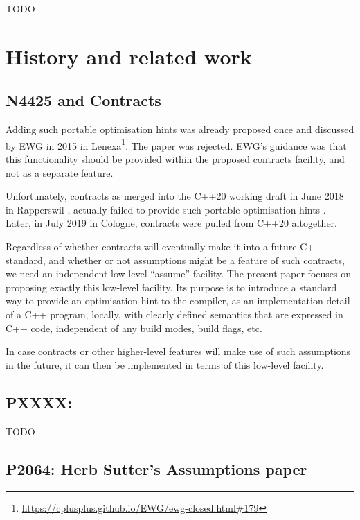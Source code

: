 TODO


\section{History and related work}

\subsection{N4425 and Contracts}

Adding such portable optimisation hints was already proposed once \cite{N4425} and discussed by EWG in 2015 in Lenexa\footnote{\url{https://cplusplus.github.io/EWG/ewg-closed.html\#179}}. The paper was rejected. EWG's guidance was that this functionality should be provided within the proposed contracts facility, and not as a separate feature.

Unfortunately, contracts as merged into the C++20 working draft in June 2018 in Rapperswil \cite{P0542R5}, actually failed to provide such portable optimisation hints \cite{P1773R0}. Later, in July 2019 in Cologne, contracts were pulled from C++20 altogether.

Regardless of whether contracts will eventually make it into a future C++ standard, and whether or not assumptions might be a feature of such contracts, we need an independent low-level ``assume'' facility.  The present paper focuses on proposing exactly this low-level facility. Its purpose is to introduce a standard way to provide an optimisation hint to the compiler, as an implementation detail of a C++ program, locally, with clearly defined semantics that are expressed in C++ code, independent of any build modes, build flags, etc.

In case contracts or other higher-level features will make use of such assumptions in the future, it can then be implemented in terms of this low-level facility.

\subsection{PXXXX: }

TODO

\subsection{P2064: Herb Sutter's Assumptions paper}

